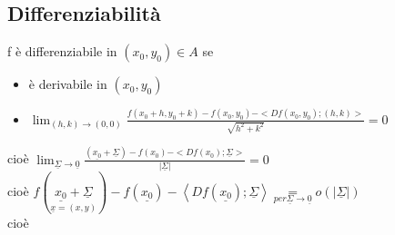 \documentclass[a4paper, oneside]{article}
\begin{document}
        \subsection{Differenziabilità}
        \begin{definition}
            f è differenziabile in $(x_0,y_0) \in A$ se
            \begin{itemize}
                \item è derivabile in $(x_0,y_0)$
                \item $\lim_{(h,k) \to (0,0)} \frac{f(x_0+h,y_0+k)-f(x_0,y_0) - <Df(x_0,y_0);(h,k)>}{\sqrt{h^2+k^2}}=0$ 
            \end{itemize}
            cioè $\lim_{\underline{\Sigma} \to \underline{0}} \frac{(\underline{x_0} + \underline{\Sigma}) -f(x_0)-<Df(x_0);\underline{\Sigma}>}{|\underline{\Sigma}|} = 0$\\
            cioè $f(\underset{\underline{x} = (x,y)}{\underline{x_0} + \underline{\Sigma}}) - f(\underline{x_0}) - \left\langle Df(\underline{x_0}); \underline{\Sigma}\right\rangle  \underset{per \underline{\Sigma} \to \underline{0}}{=} o(|\underline{\Sigma}|)$\\
            cioè 


\end{definition}
\end{document}
